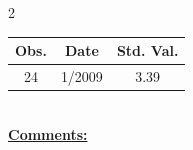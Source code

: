 
\bigskip 
\begin{multicols}{2}{ 
\begin{tabular}{ccc}
\hline  Obs.  &  Date &  Std. Val. \\ 
\hline 
                       24 &        1/2009 &          3.39 \vspace{-.12in} \\  
 \end{tabular} 
\\ 
 \columnbreak 
 \singlespacing 
 \underline{\textbf{Comments:}} \\ 
 \bigskip       

 } 
\end{multicols} 
